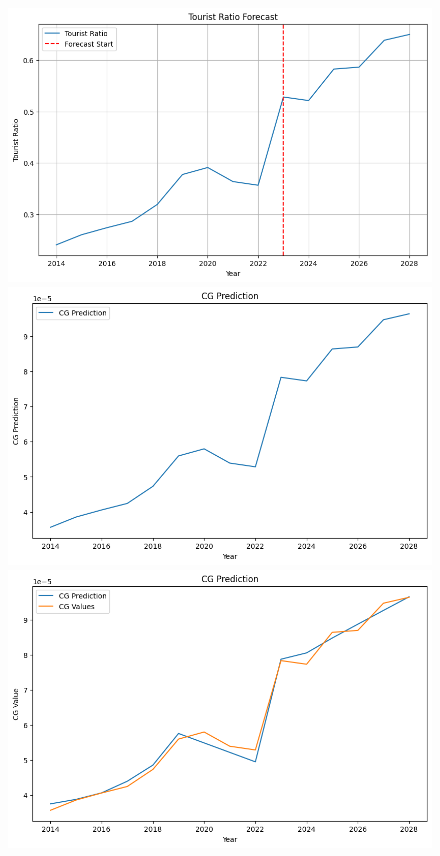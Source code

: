 \begin{figure}[ht]
    \centering
    \begin{minipage}{0.31\textwidth}
        \centering
        \includegraphics[width=\textwidth]{Ratio.png}
    \end{minipage}
    \begin{minipage}{0.31\textwidth}
        \centering
        \includegraphics[width=\textwidth]{CG_pred.png}
    \end{minipage}
    \begin{minipage}{0.31\textwidth}
        \centering
        \includegraphics[width=\textwidth]{CG_pred2.png}
    \end{minipage}


\end{figure}
